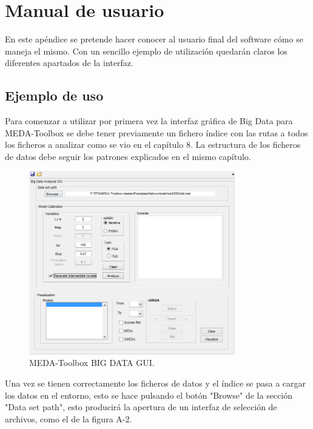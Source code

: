 \chapter{Manual de usuario}

En este apéndice se pretende hacer conocer al usuario final del software cómo se maneja el mismo. Con un sencillo ejemplo de utilización quedarán claros los diferentes apartados de la interfaz.
\bigskip

\section{Ejemplo de uso}

Para comenzar a utilizar por primera vez la interfaz gráfica de Big Data para MEDA-Toolbox se debe tener previamente un fichero índice con las rutas a todos los ficheros a analizar como se vio en el capítulo 8. La estructura de los ficheros de datos debe seguir los patrones explicados en el mismo capítulo.

\bigskip

\begin{figure}
\centering
\includegraphics[width=0.8\textwidth]{imagenes/figuras/MU-1.png}
\caption{MEDA-Toolbox BIG DATA GUI.}
\end{figure}

Una vez se tienen correctamente los ficheros de datos y el índice se pasa a cargar los datos en el entorno, esto se hace pulsando el botón "Browse" de la sección "Data set path", esto producirá la apertura de un interfaz de selección de archivos, como el de la figura A-2.

\bigskip

